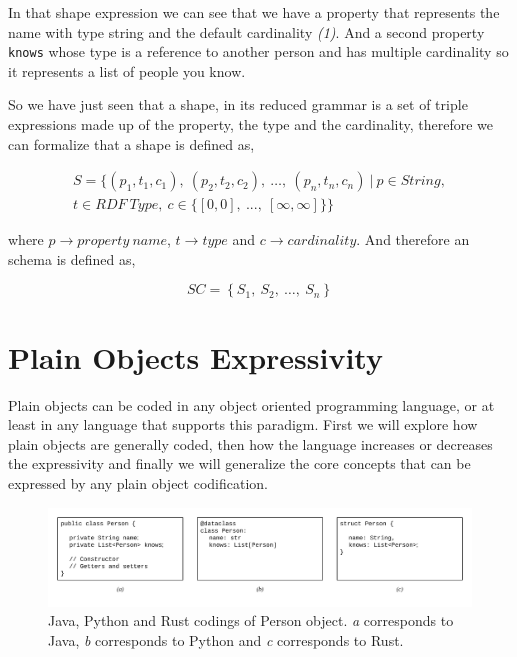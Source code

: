 In that shape expression we can see that we have a property that represents the name with type string and the default cardinality \textit{(1)}.
And a second property \texttt{knows} whose type is a reference to another person and has multiple cardinality so it represents a list of people you know.

So we have just seen that a shape, in its reduced grammar is a set of triple expressions made up of the property, the type and the cardinality,
therefore we can formalize that a shape is defined as,

\begin{equation}\label{eq:shape-formalization}
\begin{gathered}
S = \{ (p_{1},t_{1},c_{1}),\ (p_{2},t_{2},c_{2}),\ \dots,\ (p_{n},t_{n},c_{n})\ |\ p \in String,\\
t \in RDF\ Type,\ c \in \{[0,0],\ ...,\ [\infty,\infty] \} \}
\end{gathered}
\end{equation}

where $p \rightarrow property\ name$, $t \rightarrow type$ and $c \rightarrow cardinality$.
And therefore an schema is defined as,

\begin{equation}\label{eq:schema-formalization}
SC = \left \{ S_1,\ S_2,\ \dots,\ S_n \right \}
\end{equation}



\section{Plain Objects Expressivity}
Plain objects can be coded in any object oriented programming language, or at least in
any language that supports this paradigm. First we will explore how plain objects are 
generally coded, then how the language increases or decreases the expressivity and
finally we will generalize the core concepts that can be expressed by any plain object
codification.

\begin{figure}
    \includegraphics[width=\textwidth]{images/codings-exmaple.png}
    \centering
    \caption[Java, Python and Rust codings of Person object.]{Java, Python and Rust codings of Person object. 
    \textit{a} corresponds to Java, \textit{b} corresponds to Python and \textit{c} corresponds to Rust.}
    \label{fig:person-codings}
\end{figure}


